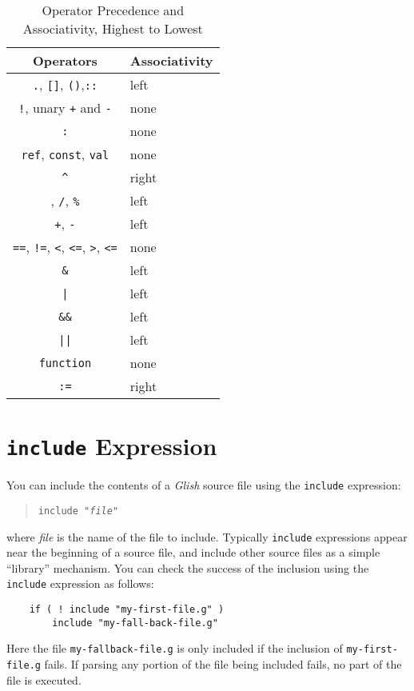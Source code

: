 \begin{table}[tbh]
\begin{center}
\begin{tabular}{|c|l|}
\hline
Operators & Associativity   \\
\hline
\hline
{\tt .}, {\tt []}, {\tt ()},{\tt ::}	& left \\
{\tt !}, unary {\tt +} and {\tt -}	& none \\
{\tt :}	& none \\
{\tt ref}, {\tt const}, {\tt val}	& none \\
\verb+^+	& right \\
{\tt *}, {\tt /}, {\tt \%}	& left \\
{\tt +}, {\tt -}	& left \\
\verb+==+, \verb+!=+, \verb+<+, \verb+<=+, \verb+>+, \verb+<=+ & none \\
{\tt \&}	& left \\
\verb+|+	& left \\
{\tt \&\&}	& left \\
\verb+||+	& left \\
{\tt function}	& none \\
{\tt :=}	& right \\
\hline
\end{tabular}
\end{center}
\caption{ Operator Precedence and Associativity, Highest to Lowest }
\label{precedence-table}
\end{table}

\section{{\tt include} Expression}
\label{include-directive}

You can include the contents of a {\em Glish} source file using the {\tt include}
expression:
\begin{quote}
    {\tt include "{\em file}"}
\end{quote}
where {\em file} is the name of the file to include. Typically {\tt include}
expressions appear near the beginning of a source file, and include other
source files as a simple ``library'' mechanism. You can check the success of the 
inclusion  using the {\tt include}
expression as follows:
\begin{verbatim}
    if ( ! include "my-first-file.g" )
        include "my-fall-back-file.g"
\end{verbatim}
Here the file \verb+my-fallback-file.g+ is only included if the inclusion of
\verb+my-first-file.g+ fails. If parsing any portion of the file being included
fails, no part of the file is executed.

